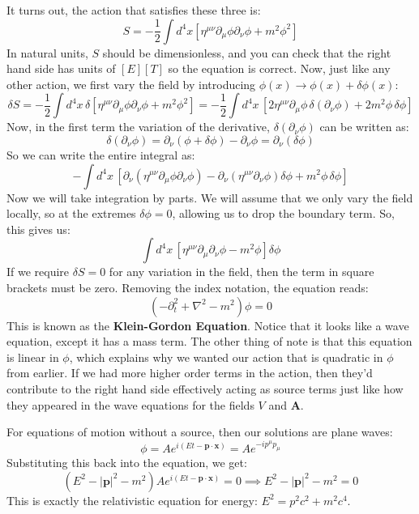 It turns out, the action that satisfies these three is:
\[
	S = -\frac{1}{2}\int d^{4}x \left[ \eta^{\mu \nu}\partial_\mu \phi \partial_\nu \phi + m^2 \phi^2 \right]
\]
In natural units, \( S \) should be dimensionless, and you can check that the right hand side has units of \(
[E][T] \) so the equation is correct. Now, just like any other action, we first vary the field by introducing
\( \phi(x) \to \phi(x) + \delta \phi(x) \): 
\[
	\delta S = -\frac{1}{2}\int d^{4}x \, \delta \left[ \eta^{\mu \nu}\partial_\mu \phi \partial_\nu \phi 
	+ m^2 \phi^2 \right] = -\frac{1}{2}\int d^{4}x  \, \left[ 2 \eta^{\mu \nu} \partial_\mu \phi
	\, \delta(\partial_\nu \phi) + 2m^2 \phi\,  \delta \phi \right]
\]
Now, in the first term the variation of the derivative, \( \delta(\partial_\nu \phi) \) can be written as:
\[
	\delta (\partial_\nu \phi) = \partial_\nu (\phi + \delta \phi) - \partial_\nu \phi = \partial_\nu (\delta
	\phi)
\]
So we can write the entire integral as:
\[
	- \int d^{4}x \, \left[ \partial_\nu \left( \eta^{\mu \nu}\partial_\mu \phi \partial_\nu \phi \right) -
	\partial_\nu \left( \eta^{\mu \nu} \partial_\nu \phi \right) \delta \phi + m^2 \phi \, \delta \phi \right]
\]
Now we will take integration by parts. We will assume that we only vary the field locally, so at the extremes
\( \delta \phi = 0 \), allowing us to drop the boundary term. So, this gives us:
\[
	\int d^{4} x \, \left[ \eta^{\mu \nu} \partial_\mu \partial_\nu \phi - m^2 \phi \right] \delta \phi
\]
If we require \( \delta S = 0 \) for any variation in the field, then the term in square brackets must be
zero. Removing the index notation, the equation reads:
\[
	(-\partial_t^2 + \nabla^2 - m^2) \phi = 0
\]
This is known as the \textbf{Klein-Gordon Equation}. Notice that it looks like a wave equation, except it
has a mass term. The other thing of note is that this equation is linear in \( \phi \), 
which explains why we wanted our action that is quadratic in \( \phi \) from earlier. 
If we had more higher order terms in the action, then they'd contribute
to the right hand side effectively acting as source terms just like how they appeared in the wave equations
for the fields \( V \) and \( \mathbf{A} \).   

For equations of motion without a source, then our solutions are plane waves:
\[
	\phi = A e^{i(Et - \mathbf{p} \cdot \mathbf{x})} = Ae^{-i p^{\mu}p_{\mu}}
\]
Substituting this back into the equation, we get:
\[
	(E^2 - |\mathbf{p}|^2 - m^2) A e^{i (Et - \mathbf{p} \cdot \mathbf{x})} = 0 \implies E^2 - |\mathbf{p}|^2
	- m^2 = 0
\]
This is exactly the relativistic equation for energy: \( E^2 = p^2 c^2 + m^2 c^{4} \). 

